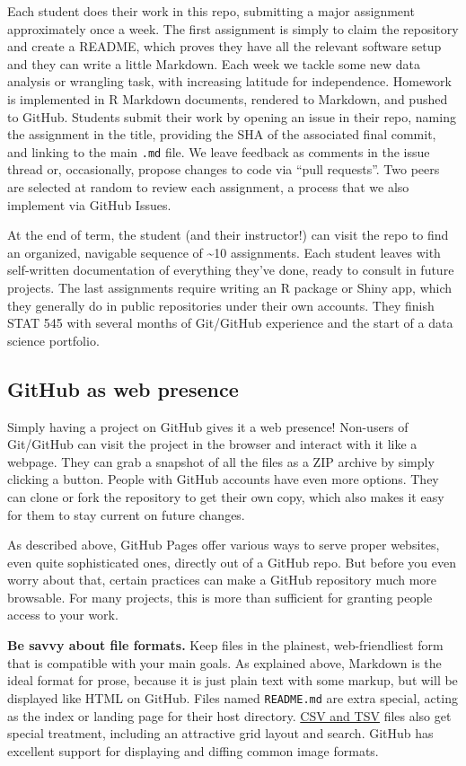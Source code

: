 \documentclass[12pt]{article}
\begin{document}
Each student does their work in this repo, submitting a major assignment
approximately once a week. The first assignment is simply to claim the
repository and create a README, which proves they have all the relevant
software setup and they can write a little Markdown. Each week we tackle
some new data analysis or wrangling task, with increasing latitude for
independence. Homework is implemented in R Markdown documents, rendered
to Markdown, and pushed to GitHub. Students submit their work by opening
an issue in their repo, naming the assignment in the title, providing
the SHA of the associated final commit, and linking to the main
\texttt{.md} file. We leave feedback as comments in the issue thread or,
occasionally, propose changes to code via ``pull requests''. Two peers
are selected at random to review each assignment, a process that we also
implement via GitHub Issues.

At the end of term, the student (and their instructor!) can visit the
repo to find an organized, navigable sequence of \textasciitilde{}10
assignments. Each student leaves with self-written documentation of
everything they've done, ready to consult in future projects. The last
assignments require writing an R package or Shiny app, which they
generally do in public repositories under their own accounts. They
finish STAT 545 with several months of Git/GitHub experience and the
start of a data science portfolio.

\subsection{GitHub as web presence}\label{github-as-web-presence}

Simply having a project on GitHub gives it a web presence! Non-users of
Git/GitHub can visit the project in the browser and interact with it
like a webpage. They can grab a snapshot of all the files as a ZIP
archive by simply clicking a button. People with GitHub accounts have
even more options. They can clone or fork the repository to get their
own copy, which also makes it easy for them to stay current on future
changes.

As described above, GitHub Pages offer various ways to serve proper
websites, even quite sophisticated ones, directly out of a GitHub repo.
But before you even worry about that, certain practices can make a
GitHub repository much more browsable. For many projects, this is more
than sufficient for granting people access to your work.

\textbf{Be savvy about file formats.} Keep files in the plainest,
web-friendliest form that is compatible with your main goals. As
explained above, Markdown is the ideal format for prose, because it is
just plain text with some markup, but will be displayed like HTML on
GitHub. Files named \texttt{README.md} are extra special, acting as the
index or landing page for their host directory.
\href{https://help.github.com/articles/rendering-csv-and-tsv-data/}{CSV
and TSV} files also get special treatment, including an attractive grid
layout and search. GitHub has excellent support for displaying and
diffing common image formats.
\end{document}
